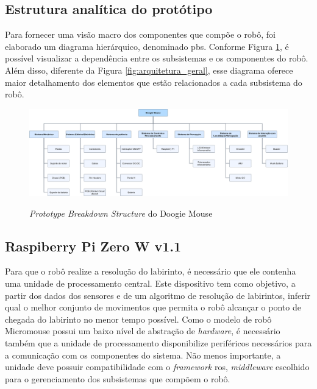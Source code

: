 \subsection{Estrutura analítica do protótipo}
\label{ssec:pbs}
Para fornecer uma visão macro dos componentes que compõe o robô, foi elaborado um diagrama hierárquico, denominado \gls*{pbs}. Conforme Figura \ref{fig:pbs}, é possível visualizar a dependência entre os subsistemas e os componentes do robô. Além disso, diferente da Figura \ref{fig:arquitetura_geral}, esse diagrama oferece maior detalhamento dos elementos que estão relacionados a cada subsistema do robô.

\begin{figure}[H]
	\centering
	\caption{\textit{Prototype Breakdown Structure} do Doogie Mouse}
	\includegraphics[width=1\textwidth]
	{Figures/prototype_breakdown_structure}
	\label{fig:pbs}
\end{figure}

\subsection{Raspiberry Pi Zero W v1.1}
\label{ssec:raspiberry_pi_zero}
Para que o robô realize a resolução do labirinto, é necessário que ele contenha uma unidade de processamento central. Este dispositivo tem como objetivo, a partir dos dados dos sensores e de um algoritmo de resolução de labirintos, inferir qual o melhor conjunto de movimentos que permita o robô alcançar o ponto de chegada do labirinto no menor tempo possível. Como o modelo de robô Micromouse possui um baixo nível de abstração de \textit{hardware}, é necessário também que a unidade de processamento disponibilize periféricos necessários para a comunicação com os componentes do sistema. Não menos importante, a unidade deve possuir compatibilidade com o \textit{framework} \gls*{ros}, \textit{middleware }escolhido para o gerenciamento dos subsistemas que compõem o robô.

